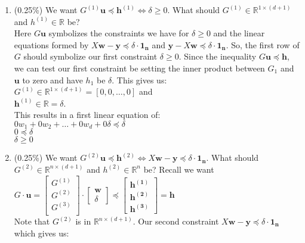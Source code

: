 \documentclass[12pt]{article}
\newcounter{ques}
\newenvironment{question}{\stepcounter{ques}{\noindent\bf Question \arabic{ques}:}}{\vspace{5mm}}
\begin{document}
\begin{question}
\begin{enumerate}[(a)]
\begin{enumerate}[(b.1)]
      \item (0.25\%) We want $G^{(1)}\mathbf{u} \preceq \mathbf{h}^{(1)} \iff \delta \ge 0.$ What should $G^{(1)} \in \mathbb{R}^{1 \times (d+1)}$ and $h^{(1)} \in \mathbb{R}$ be? \\
      Here $G \mathbf{u}$ symbolizes the constraints we have for $\delta \ge 0$ and the linear equations formed by $X\mathbf{w} - \mathbf{y} \preceq \delta \cdot \mathbf{1_n}$ and $\mathbf{y} - X\mathbf{w} \preceq \delta \cdot \mathbf{1_n}$. So, the first row of $G$ should symbolize our first constraint $\delta \ge 0$. Since the inequality $G \mathbf{u} \preceq \mathbf{h}$, we can test our first constraint be setting the inner product between $G_1$ and $\mathbf{u}$ to zero and have $h_1$ be $\delta$. This gives us: \\
      $G^{(1)} \in \mathbb{R}^{1 \times (d+1)} = [0, 0, \ldots, 0]$  and \\
      $\mathbf{h}^{(1)} \in \mathbb{R} = \delta$. \\
      This results in a first linear equation of: \\
      $0 w_1 + 0 w_2 + \ldots + 0 w_d + 0 \delta \preceq \delta$ \\
      $0 \preceq \delta$  \\
      $\delta \ge 0$ 
      \item (0.25\%) We want $G^{(2)}\mathbf{u} \preceq \mathbf{h}^{(2)} \iff X \mathbf{w} - \mathbf{y} \preceq \delta \cdot \mathbf{1_n}.$ What should $G^{(2)} \in \mathbb{R}^{n \times (d+1)}$ and $h^{(2)} \in \mathbb{R}^n$ be?
      Recall we want \\
      $G \cdot \mathbf{u} = \begin{bmatrix}
        G^{(1)} \\
        G^{(2)} \\
        G^{(3)} \\
      \end{bmatrix} \cdot 
      \begin{bmatrix}
       \mathbf{w} \\
       \delta 
      \end{bmatrix} \preceq \begin{bmatrix}
        \mathbf{h^{(1)}} \\
        \mathbf{h^{(2)}} \\
        \mathbf{h^{(3)}}
      \end{bmatrix} = \mathbf{h}$ \\
      Note that $G^{(2)}$ is in $\mathbb{R}^{n \times (d+1)}$. Our second constraint $X \mathbf{w} - \mathbf{y} \preceq \delta \cdot \mathbf{1_n}$ which gives us: \\

\end{enumerate}
\end{enumerate}
\end{question}
\end{document}
